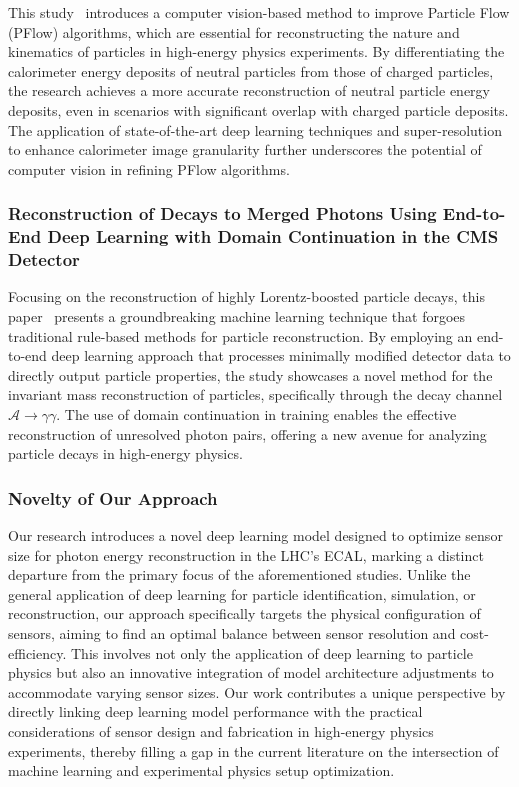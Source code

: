 \documentclass[conference]{IEEEtran}
\begin{document}
This study~\cite{Di_Bello_2021} introduces a computer vision-based method to improve Particle Flow (PFlow) algorithms, which are essential for reconstructing the nature and kinematics of particles in high-energy physics experiments. By differentiating the calorimeter energy deposits of neutral particles from those of charged particles, the research achieves a more accurate reconstruction of neutral particle energy deposits, even in scenarios with significant overlap with charged particle deposits. The application of state-of-the-art deep learning techniques and super-resolution to enhance calorimeter image granularity further underscores the potential of computer vision in refining PFlow algorithms.

\subsubsection{Reconstruction of Decays to Merged Photons Using End-to-End Deep Learning with Domain Continuation in the CMS Detector}

Focusing on the reconstruction of highly Lorentz-boosted particle decays, this paper~\cite{PhysRevD.108.052002} presents a groundbreaking machine learning technique that forgoes traditional rule-based methods for particle reconstruction. By employing an end-to-end deep learning approach that processes minimally modified detector data to directly output particle properties, the study showcases a novel method for the invariant mass reconstruction of particles, specifically through the decay channel $\mathcal{A} \to \gamma \gamma$. The use of domain continuation in training enables the effective reconstruction of unresolved photon pairs, offering a new avenue for analyzing particle decays in high-energy physics.

\subsubsection{Novelty of Our Approach}

Our research introduces a novel deep learning model designed to optimize sensor size for photon energy reconstruction in the LHC's ECAL, marking a distinct departure from the primary focus of the aforementioned studies. Unlike the general application of deep learning for particle identification, simulation, or reconstruction, our approach specifically targets the physical configuration of sensors, aiming to find an optimal balance between sensor resolution and cost-efficiency. This involves not only the application of deep learning to particle physics but also an innovative integration of model architecture adjustments to accommodate varying sensor sizes. Our work contributes a unique perspective by directly linking deep learning model performance with the practical considerations of sensor design and fabrication in high-energy physics experiments, thereby filling a gap in the current literature on the intersection of machine learning and experimental physics setup optimization.
\end{document}
